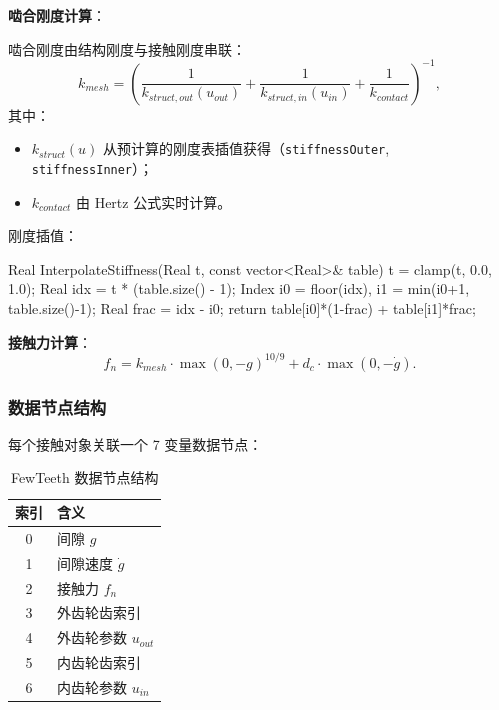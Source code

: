 \documentclass[12pt]{ctexart}
\begin{document}
\textbf{啮合刚度计算}：

啮合刚度由结构刚度与接触刚度串联：
\begin{equation}
k_{mesh} = \left( \frac{1}{k_{struct,out}(u_{out})} + \frac{1}{k_{struct,in}(u_{in})} + \frac{1}{k_{contact}} \right)^{-1},
\end{equation}
其中：
\begin{itemize}
  \item $k_{struct}(u)$ 从预计算的刚度表插值获得（\verb|stiffnessOuter|, \verb|stiffnessInner|）；
  \item $k_{contact}$ 由 Hertz 公式实时计算。
\end{itemize}

刚度插值：
\begin{cppcode}[刚度表插值]
Real InterpolateStiffness(Real t, const vector<Real>& table) {
    t = clamp(t, 0.0, 1.0);
    Real idx = t * (table.size() - 1);
    Index i0 = floor(idx), i1 = min(i0+1, table.size()-1);
    Real frac = idx - i0;
    return table[i0]*(1-frac) + table[i1]*frac;
}
\end{cppcode}

\textbf{接触力计算}：
\begin{equation}
f_n = k_{mesh} \cdot \max(0, -g)^{10/9} + d_c \cdot \max(0, -\dot{g}).
\end{equation}

\subsubsection{数据节点结构}

每个接触对象关联一个 7 变量数据节点：
\begin{table}[htbp]
\centering
\small
\begin{tabular}{cl}
\toprule
索引 & 含义 \\ 
\midrule
0 & 间隙 $g$ \\ 
1 & 间隙速度 $\dot{g}$ \\ 
2 & 接触力 $f_n$ \\ 
3 & 外齿轮齿索引 \\ 
4 & 外齿轮参数 $u_{out}$ \\ 
5 & 内齿轮齿索引 \\ 
6 & 内齿轮参数 $u_{in}$ \\ 
\bottomrule
\end{tabular}
\caption{FewTeeth 数据节点结构}
\end{table}
\end{document}
